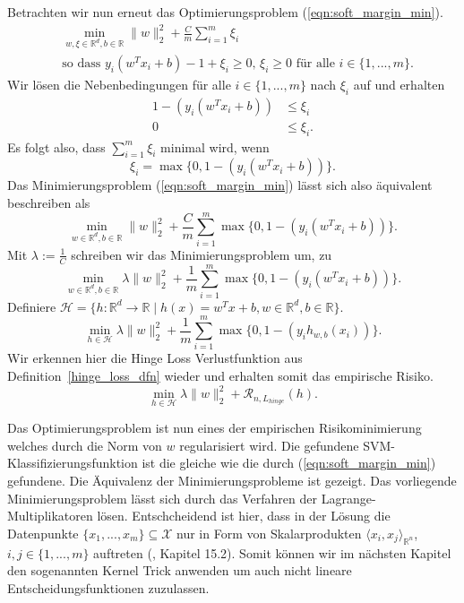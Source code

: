 \documentclass{article}
\theoremstyle{plain}
\theoremstyle{definition}
\begin{document}
Betrachten wir nun erneut das Optimierungsproblem (\ref{eqn:soft_margin_min}).
\begin{equation*}
\begin{split}
    & \min_{w, \xi \in \mathbb{R}^d, b \in \mathbb{R}} \|w\|_{2}^{2} + \frac{C}{m} \sum_{i = 1}^{m} \xi_i \\
    & \textrm{so dass } y_i(w^T x_i + b ) - 1 + \xi_i \geq 0, \, \xi_i \geq 0 \textrm{ für alle } i \in \{1,...,m\}.
\end{split}
\end{equation*}
Wir lösen die Nebenbedingungen für alle $i \in \{1,...,m\}$ nach $\xi_i$ auf und erhalten
\begin{equation*}
\begin{split}
    1 - ( y_i (w^T x_i + b)) & \leq \xi_i \\
    0 & \leq \xi_i.
\end{split}
\end{equation*}
Es folgt also, dass $\sum_{i=1}^{m} \xi_i$ minimal wird, wenn 
\[
    \xi_i = \max \{0, 1 - ( y_i (w^T x_i + b))\}.
\]
Das Minimierungsproblem (\ref{eqn:soft_margin_min}) lässt sich also äquivalent beschreiben als
\begin{equation*}
    \min_{w \in \mathbb{R}^d, b \in \mathbb{R}} \|w\|_{2}^{2} + \frac{C}{m} \sum_{i=1}^{m}\max\{0,1-(y_i(w^T x_i + b))\}.
\end{equation*}
Mit $\lambda := \frac{1}{C}$ schreiben wir das Minimierungsproblem um, zu
\begin{equation*}
    \min_{w \in \mathbb{R}^d, b \in \mathbb{R}} \lambda \|w\|_{2}^{2} + \frac{1}{m} \sum_{i=1}^{m}\max\{0,1-(y_i(w^T x_i + b))\}.
\end{equation*}
Definiere $\mathcal{H} = \{h: \mathbb{R}^d \to \mathbb{R} \mid h(x) = w^T x + b, w \in \mathbb{R}^d, b \in \mathbb{R}\}$.
\begin{equation*}
    \min_{h \in \mathcal{H}} \lambda \|w\|_{2}^{2} + \frac{1}{m} \sum_{i = 1}^{m} \max \{0, 1-(y_i h_{w,b}(x_i))\}.
\end{equation*}
Wir erkennen hier die Hinge Loss Verlustfunktion aus Definition~\ref{hinge_loss_dfn} wieder und erhalten somit das empirische Risiko.
\begin{equation} \label{eqn:erm_linear}
    \min_{h \in \mathcal{H}} \lambda \|w\|_{2}^{2} +\mathcal{R}_{n,L_{hinge}}(h).
\end{equation}

Das Optimierungsproblem ist nun eines der empirischen Risikominimierung welches durch die Norm von $w$ regularisiert wird. Die gefundene SVM-Klassifizierungsfunktion ist die gleiche wie die durch (\ref{eqn:soft_margin_min}) gefundene. Die Äquivalenz der Minimierungsprobleme ist gezeigt.
Das vorliegende Minimierungsproblem lässt sich durch das Verfahren der Lagrange-Multiplikatoren lösen.
Entschcheidend ist hier, dass in der Lösung die Datenpunkte $\{x_{1},...,x_{m}\} \subseteq \mathcal{X}$ nur in Form von Skalarprodukten $\langle x_{i}, x_{j} \rangle_{\mathbb{R}^{n}}$, $i,j \in \{1,...,m\}$ auftreten (\cite{understanding}, Kapitel 15.2). 
Somit können wir im nächsten Kapitel den sogenannten Kernel Trick anwenden um auch nicht lineare Entscheidungsfunktionen zuzulassen.
\end{document}
